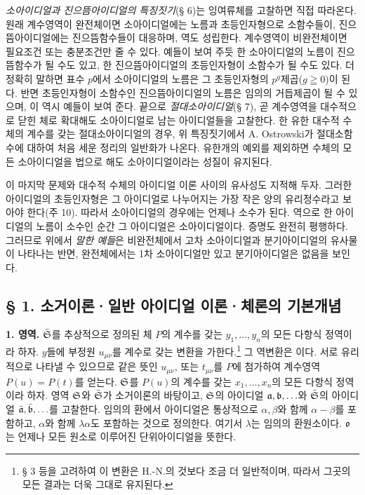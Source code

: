 \emph{소아이디얼과 진으뜸아이디얼의 특징짓기}(§ 6)는 잉여류체를 고찰하면 직접 따라온다. 원래 계수영역이 완전체이면 소아이디얼에는 노름과 초등인자형으로 소함수들이, 진으뜸아이디얼에는 진으뜸함수들이 대응하며, 역도 성립한다. 계수영역이 비완전체이면 필요조건 또는 충분조건만 줄 수 있다. 예들이 보여 주듯 한 소아이디얼의 노름이 진으뜸함수가 될 수도 있고, 한 진으뜸아이디얼의 초등인자형이 소함수가 될 수도 있다. 더 정확히 말하면 표수 \(p\)에서 소아이디얼의 노름은 그 초등인자형의 \(p^g\)제곱(\(g\geqq0\))이 된다. 반면 초등인자형이 소함수인 진으뜸아이디얼의 노름은 임의의 거듭제곱이 될 수 있으며, 이 역시 예들이 보여 준다. 끝으로 \emph{절대소아이디얼}(§ 7), 곧 계수영역을 대수적으로 닫힌 체로 확대해도 소아이디얼로 남는 아이디얼들을 고찰한다. 한 유한 대수적 수체의 계수를 갖는 절대소아이디얼의 경우, 위 특징짓기에서 A. Ostrowski가 절대소함수에 대하여 처음 세운 정리의 일반화가 나온다. 유한개의 예외를 제외하면 수체의 모든 소아이디얼을 법으로 해도 소아이디얼이라는 성질이 유지된다.

이 마지막 문제와 대수적 수체의 아이디얼 이론 사이의 유사성도 지적해 두자. 그러한 아이디얼의 초등인자형은 그 아이디얼로 나누어지는 가장 작은 양의 유리정수라고 보아야 한다(주 10). 따라서 소아이디얼의 경우에는 언제나 소수가 된다. 역으로 한 아이디얼의 노름이 소수인 순간 그 아이디얼은 소아이디얼이다. 증명도 완전히 평행하다. 그러므로 위에서 \emph{말한 예들}은 비완전체에서 고차 소아이디얼과 분기아이디얼의 유사물이 나타나는 반면, 완전체에서는 1차 소아이디얼만 있고 분기아이디얼은 없음을 보인다.

\subsection*{§ 1. 소거이론·일반 아이디얼 이론·체론의 기본개념}

\textbf{1. 영역.} \(\bar{\mathfrak S}\)를 추상적으로 정의된 체 \(P\)의 계수를 갖는 \(y_1,\ldots,y_n\)의 모든 다항식 정역이라 하자. \(y\)들에 부정원 \(u_{\mu\nu}\)를 계수로 갖는 변환을 가한다.\footnote{§ 3 등을 고려하여 이 변환은 H.-N.의 것보다 조금 더 일반적이며, 따라서 그곳의 모든 결과는 더욱 그대로 유지된다.}
그 역변환은
이다. 서로 유리적으로 나타낼 수 있으므로 같은 뜻인 \(u_{\mu\nu}\), 또는 \(t_{\mu\nu}\)를 \(P\)에 첨가하여 계수영역 \(P(u)=P(t)\)를 얻는다. \(\mathfrak S\)를 \(P(u)\)의 계수를 갖는 \(x_1,\ldots,x_n\)의 모든 다항식 정역이라 하자. 영역 \(\mathfrak S\)와 \(\bar{\mathfrak S}\)가 소거이론의 바탕이고, \(\mathfrak S\)의 아이디얼 \(\mathfrak a,\mathfrak b,\ldots\)와 \(\bar{\mathfrak S}\)의 아이디얼 \(\bar{\mathfrak a},\bar{\mathfrak b},\ldots\)를 고찰한다. 임의의 환에서 아이디얼은 통상적으로 \(\alpha,\beta\)와 함께 \(\alpha-\beta\)를 포함하고, \(\alpha\)와 함께 \(\lambda\alpha\)도 포함하는 것으로 정의한다. 여기서 \(\lambda\)는 임의의 환원소이다. \(\mathfrak o\)는 언제나 모든 원소로 이루어진 단위아이디얼을 뜻한다.

